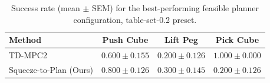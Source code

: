 \begin{table}[t]
\centering
\begin{tabular}{lccc}
\toprule
Method & Push Cube & Lift Peg & Pick Cube \\
\midrule
TD-MPC2 & $0.600 \pm 0.155$ & $0.200 \pm 0.126$ & $1.000 \pm 0.000$ \\
Squeeze-to-Plan (Ours) & $0.800 \pm 0.126$ & $0.300 \pm 0.145$ & $0.200 \pm 0.126$ \\
\bottomrule
\end{tabular}
\caption{Success rate (mean $\pm$ SEM) for the best-performing feasible planner configuration, table-set-0.2 preset.}
\label{tab:latency_vs_success_rate_table-set-0.2}
\end{table}
